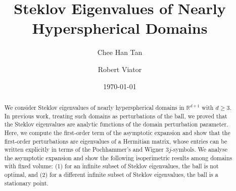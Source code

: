 \documentclass[11pt]{amsart}
\theoremstyle{definition}
\theoremstyle{plain}
\theoremstyle{remark}
\newcommand{\R}{\mathbb{R}}
\begin{document}
 
\title{Steklov Eigenvalues of Nearly Hyperspherical Domains} 
\author{Chee Han Tan}
\address{Department of Mathematics, Wake Forest University, Winston-Salem, NC} 

\author{Robert Viator} 
\address{Department of Mathematics, Denison University, Granville, OH} 


\date{\today} 

\begin{abstract} 
We consider Steklov eigenvalues of nearly hyperspherical domains in $\R^{d + 1}$ with $d\ge 3$. In previous work, treating such domains as perturbations of the ball, we proved that the Steklov eigenvalues are analytic functions of the domain perturbation parameter. Here, we compute the first-order term of the asymptotic expansion and show that the first-order perturbations are eigenvalues of a Hermitian matrix, whose entries can be written explicitly in terms of the Pochhammer's and Wigner $3j$-symbols. We analyse the asymptotic expansion and show the following isoperimetric results among domains with fixed volume: (1) for an infinite subset of Steklov eigenvalues, the ball is not optimal, and (2) for a different infinite subset of Steklov eigenvalues, the ball is a stationary point. 
\end{abstract} 

\maketitle 


\end{document}
